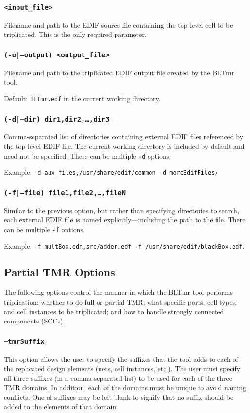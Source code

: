 \documentclass[english]{article}
\begin{document}
\subsubsection{\texttt{<input\_file>}}
Filename and path to the EDIF source file containing the top-level cell to be 
triplicated. This is the only required parameter.

\subsubsection{\texttt{(-o|--output) <output\_file>}}
Filename and path to the triplicated EDIF output file created by the BLTmr
tool. 

Default: \texttt{BLTmr.edf} in the current working directory.

\subsubsection{\texttt{(-d|--dir) dir1,dir2,\ldots,dir3}}
Comma-separated list of directories containing external EDIF files referenced 
by the top-level EDIF file. The current working directory is included by 
default and need not be specified. There can be multiple \texttt{-d} options.

Example: \texttt{-d aux\_files,/usr/share/edif/common -d moreEdifFiles/}

\subsubsection{\texttt{(-f|--file) file1,file2,\ldots,fileN}}
Similar to the previous option, but rather than specifying directories to 
search, each external EDIF file is named explicitly---including the path to the 
file. There can be multiple \texttt{-f} options. 

Example: \texttt{-f multBox.edn,src/adder.edf -f /usr/share/edif/blackBox.edf}.

\subsection{Partial TMR Options}
The following options control the manner in which the BLTmr tool performs
triplication: whether to do full or partial TMR; what specific ports, cell
types, and cell instances to be triplicated; and how to handle strongly
connected components (SCCs).

\subsubsection{\texttt{--tmrSuffix}}
This option allows the user to specify the suffixes that the tool adds to each
of the replicated design elements (nets, cell instances, etc.). The user must
specify all three suffixes (in a comma-separated list) to be used for each of
the three TMR domains. In addition, each of the domains must be unique to avoid
naming conflicts. One of suffixes may be left blank to signify that no suffix
should be added to the elements of that domain.
\end{document}
